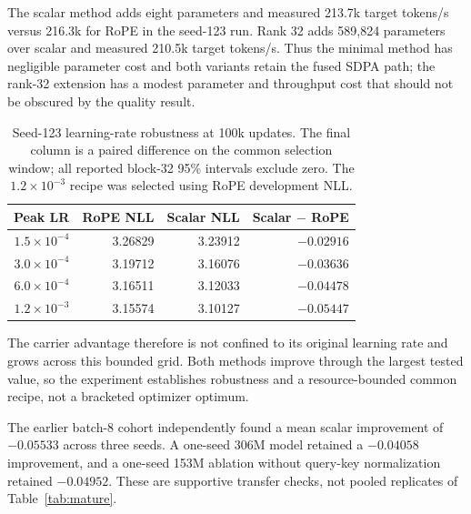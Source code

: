 \documentclass{article}
\begin{document}
The scalar method adds eight parameters and measured 213.7k target tokens/s
versus 216.3k for RoPE in the seed-123 run. Rank 32 adds 589,824 parameters
over scalar and measured 210.5k target tokens/s. Thus the minimal method has
negligible parameter cost and both variants retain the fused SDPA path; the
rank-32 extension has a modest parameter and throughput cost that should not
be obscured by the quality result.

\begin{table}[t]
\centering
\caption{Seed-123 learning-rate robustness at 100k updates. The final column
is a paired difference on the common selection window; all reported block-32
95\% intervals exclude zero. The $1.2\times10^{-3}$ recipe was selected using
RoPE development NLL.}
\label{tab:lrsensitivity}
\begin{tabular}{rrrr}
\toprule
Peak LR & RoPE NLL & Scalar NLL & Scalar $-$ RoPE \\
\midrule
$1.5\times10^{-4}$ & 3.26829 & 3.23912 & $-0.02916$ \\
$3.0\times10^{-4}$ & 3.19712 & 3.16076 & $-0.03636$ \\
$6.0\times10^{-4}$ & 3.16511 & 3.12033 & $-0.04478$ \\
$1.2\times10^{-3}$ & 3.15574 & 3.10127 & $-0.05447$ \\
\bottomrule
\end{tabular}
\end{table}

The carrier advantage therefore is not confined to its original learning
rate and grows across this bounded grid. Both methods improve through the
largest tested value, so the experiment establishes robustness and a
resource-bounded common recipe, not a bracketed optimizer optimum.

The earlier batch-8 cohort independently found a mean scalar improvement of
$-0.05533$ across three seeds. A one-seed 306M model retained a $-0.04058$
improvement, and a one-seed 153M ablation without query-key normalization
retained $-0.04952$. These are supportive transfer checks, not pooled
replicates of Table~\ref{tab:mature}.
\end{document}

